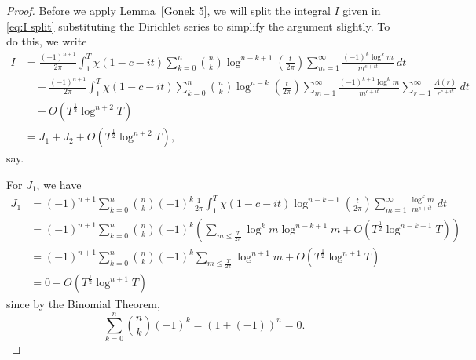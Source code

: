 \documentclass[10pt,a4paper]{amsart}
\begin{document}
\begin{proof}
Before we apply Lemma~\ref{Gonek 5}, we will split the integral $I$ given in \eqref{eq:I split} substituting the Dirichlet series to simplify the argument slightly. To do this, we write
\begin{align*}
I &= \frac{(-1)^{n+1}}{2 \pi } \int_{1}^{T} \chi (1 - c - it) \sum_{k=0}^n \binom{n}{k} \log^{n-k+1} \left( \frac{t}{2 \pi} \right) \sum_{m=1}^{\infty} \frac{(-1)^k \log^k m}{m^{c + it}} \ dt \\
& \quad +\frac{(-1)^{n+1}}{2 \pi } \int_{1}^{T} \chi (1 - c - it) \sum_{k=0}^n \binom{n}{k} \log^{n-k} \left( \frac{t}{2 \pi} \right) \sum_{m=1}^{\infty} \frac{(-1)^{k+1} \log^k m}{m^{c + it}} \sum_{r=1}^{\infty} \frac{\Lambda (r)}{r^{c+it}} \ dt \\
& \quad + O(T^{\frac{1}{2}} \log^{n+2} T) \\
&= J_1 + J_2 +O(T^{\frac{1}{2}} \log^{n+2} T),
\end{align*}
say.

For $J_1$, we have
\begin{align*}
J_1 &= (-1)^{n+1}\sum_{k=0}^n \binom{n}{k} (-1)^k  \frac{1}{2 \pi } \int_{1}^{T} \chi (1 - c - it) \log^{n-k+1} \left( \frac{t}{2 \pi} \right) \sum_{m=1}^{\infty} \frac{ \log^k m}{m^{c + it}} \ dt \\
&= (-1)^{n+1} \sum_{k=0}^n \binom{n}{k} (-1)^k \left( \sum_{m \leq \frac{T}{2 \pi}} \log^k m \log^{n-k+1} m +O(T^{\frac{1}{2}}\log^{n-k+1} T) \right)\\
&= (-1)^{n+1} \sum_{k=0}^n \binom{n}{k} (-1)^k \sum_{m \leq \frac{T}{2 \pi}} \log^{n+1} m + O(T^{\frac{1}{2}}\log^{n+1} T) \\
&=0 + O(T^{\frac{1}{2}}\log^{n+1} T)
\end{align*}
since by the Binomial Theorem,
\[
\sum_{k=0}^n \binom{n}{k} (-1)^k = (1 + (-1))^n = 0.
\]


\end{proof}
\end{document}
